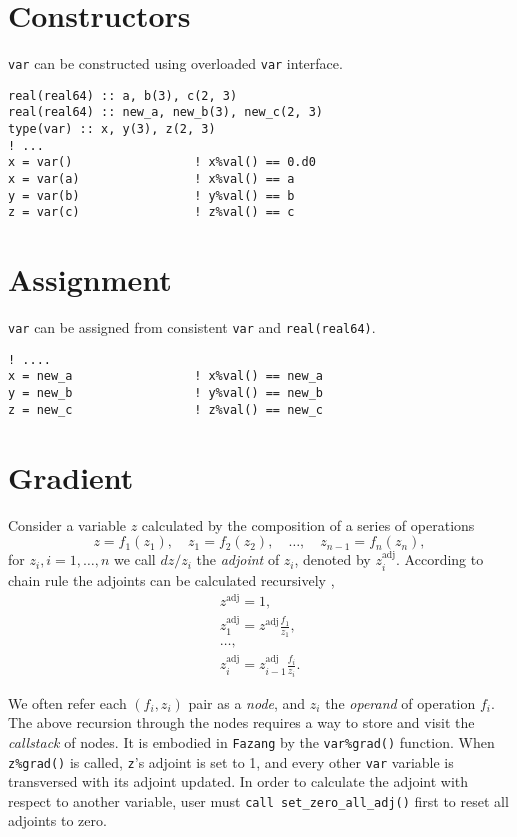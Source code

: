\documentclass[12pt, reqno, oneside]{amsbook}
\begin{document}
\section{Constructors}
\label{sec:org101898e}
\texttt{var} can be constructed using overloaded \texttt{var} interface.
\begin{verbatim}
real(real64) :: a, b(3), c(2, 3)
real(real64) :: new_a, new_b(3), new_c(2, 3)
type(var) :: x, y(3), z(2, 3)
! ...
x = var()                 ! x%val() == 0.d0
x = var(a)                ! x%val() == a
y = var(b)                ! y%val() == b
z = var(c)                ! z%val() == c
\end{verbatim}
\section{Assignment}
\label{sec:orge73f903}
\texttt{var} can be assigned from consistent \texttt{var} and \texttt{real(real64)}.
\begin{verbatim}
! ....
x = new_a                 ! x%val() == new_a
y = new_b                 ! y%val() == new_b
z = new_c                 ! z%val() == new_c
\end{verbatim}

\section{Gradient}
\label{sec:orged71949}
   \label{sec:gradient}
Consider a variable \(z\) calculated by the composition of a series of operations
\begin{equation*}
z = f_1(z_1), \quad z_1 = f_2(z_2), \quad \dots, \quad z_{n-1} = f_n(z_n),
\end{equation*}
for \(z_i, i = 1, \dots, n\) we call \(dz/{z_i}\) the \emph{adjoint} of \(z_i\),
denoted by \(z_i^{\text{adj}}\).
According to chain rule the adjoints can be calculated recursively \cite{griewank_evaluating_2008},
\begin{align*}
z^{\text{adj}} = 1, \\
z_1^{\text{adj}} = z^{\text{adj}} \frac{f_1}{z_1}, \\
\dots, \\
z_i^{\text{adj}} = z_{i-1}^{\text{adj}} \frac{f_i}{z_i}.
\end{align*}

We often refer each \((f_i, z_i)\) pair as a
\emph{node}, and \(z_i\) the \emph{operand} of operation \(f_i\). The above recursion through the nodes requires a way to store
and visit the \emph{callstack} of nodes.  It is embodied in \texttt{Fazang} by the \texttt{var\%grad()}
function. When \texttt{z\%grad()} is called, \texttt{z}'s adjoint is set to 1, and
every other \texttt{var} variable is transversed with its adjoint updated. In
order to calculate the adjoint with respect to another variable, user
must \texttt{call set\_zero\_all\_adj()} first to reset all adjoints to zero.
\end{document}
